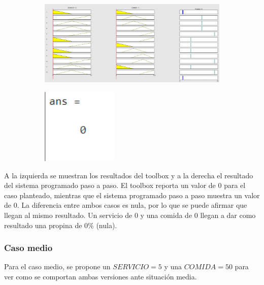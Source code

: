\documentclass[11pt, letterpaper]{article}
\begin{document}
\begin{figure}[h]
	\centering
	\begin{subfigure}{0.40\textwidth} %
		\centering
		\includegraphics[width=1.4\textwidth]{IMG/RP11.png}
		\label{fig:G3}
	\end{subfigure}
	\hfill
	\begin{subfigure}{0.42\textwidth} %
		\centering
		\includegraphics[width=0.4\textwidth]{IMG/M11.png}
		\label{fig:G4}
	\end{subfigure}
	\label{fig:comparacion2}
\end{figure}

A la izquierda se muestran los resultados del toolbox y a la derecha el resultado del sistema programado paso a paso. El toolbox reporta un valor de 0 para el caso planteado, mientras que el sistema programado paso a paso muestra un valor de 0. La diferencia entre ambos casos es nula, por lo que se puede afirmar que llegan al mismo resultado. Un servicio de 0 y una comida de 0 llegan a dar como resultado una propina de 0\% (nula).

\newpage

\subsubsection{Caso medio}
Para el caso medio, se propone un $SERVICIO = 5$ y una $COMIDA = 50$ para ver como se comportan ambas versiones ante situación media.
\end{document}
